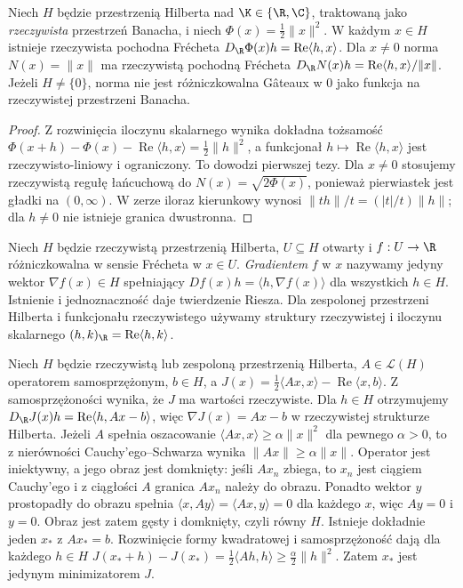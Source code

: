 \begin{twierdzenie}
\label{thm:hilbert-norm14}
Niech $H$ będzie przestrzenią Hilberta nad $\K\in\{\R,\C\}$, traktowaną jako \emph{rzeczywista} przestrzeń Banacha, i niech $\Phi(x)=\frac12\|x\|^2$. W każdym $x\in H$ istnieje rzeczywista pochodna Frécheta $D_{\R}\Phi(x)h=\operatorname{Re}\langle h,x\rangle$. Dla $x\ne0$ norma $N(x)=\|x\|$ ma rzeczywistą pochodną Frécheta
$D_{\R}N(x)h=\operatorname{Re}\langle h,x\rangle/\|x\|$.
Jeżeli $H\ne\{0\}$, norma nie jest różniczkowalna Gâteaux w $0$ jako funkcja na rzeczywistej przestrzeni Banacha.
\end{twierdzenie}
\begin{proof}
Z rozwinięcia iloczynu skalarnego wynika dokładna tożsamość
$\Phi(x+h)-\Phi(x)-\operatorname{Re}\langle h,x\rangle=\frac12\|h\|^2$, a funkcjonał $h\mapsto\operatorname{Re}\langle h,x\rangle$ jest rzeczywisto-liniowy i ograniczony. To dowodzi pierwszej tezy. Dla $x\ne0$ stosujemy rzeczywistą regułę łańcuchową do $N(x)=\sqrt{2\Phi(x)}$, ponieważ pierwiastek jest gładki na $(0,\infty)$. W zerze iloraz kierunkowy wynosi $\|th\|/t=(|t|/t)\|h\|$; dla $h\ne0$ nie istnieje granica dwustronna.
\end{proof}

\begin{definicja}
\label{def:gradient14}
Niech $H$ będzie rzeczywistą przestrzenią Hilberta, $U\subseteq H$ otwarty i $f:U\to\R$ różniczkowalna w sensie Frécheta w $x\in U$. \emph{Gradientem} $f$ w $x$ nazywamy jedyny wektor $\nabla f(x)\in H$ spełniający $Df(x)h=\langle h,\nabla f(x)\rangle$ dla wszystkich $h\in H$. Istnienie i jednoznaczność daje twierdzenie Riesza. Dla zespolonej przestrzeni Hilberta i funkcjonału rzeczywistego używamy struktury rzeczywistej i iloczynu skalarnego $(h,k)_{\R}=\operatorname{Re}\langle h,k\rangle$.
\end{definicja}

\begin{przyklad}
\label{ex:quadratic-energy14}
Niech $H$ będzie rzeczywistą lub zespoloną przestrzenią Hilberta, $A\in\mathcal L(H)$ operatorem samosprzężonym, $b\in H$, a $J(x)=\frac12\langle Ax,x\rangle-\operatorname{Re}\langle x,b\rangle$. Z samosprzężoności wynika, że $J$ ma wartości rzeczywiste. Dla $h\in H$ otrzymujemy
$D_{\R}J(x)h=\operatorname{Re}\langle h,Ax-b\rangle$, więc $\nabla J(x)=Ax-b$ w rzeczywistej strukturze Hilberta. Jeżeli $A$ spełnia oszacowanie $\langle Ax,x\rangle\ge\alpha\|x\|^2$ dla pewnego $\alpha>0$, to z nierówności Cauchy'ego--Schwarza wynika $\|Ax\|\ge\alpha\|x\|$. Operator jest iniektywny, a jego obraz jest domknięty: jeśli $Ax_n$ zbiega, to $x_n$ jest ciągiem Cauchy'ego i z ciągłości $A$ granica $Ax_n$ należy do obrazu. Ponadto wektor $y$ prostopadły do obrazu spełnia $\langle x,Ay\rangle=\langle Ax,y\rangle=0$ dla każdego $x$, więc $Ay=0$ i $y=0$. Obraz jest zatem gęsty i domknięty, czyli równy $H$. Istnieje dokładnie jeden $x_*$ z $Ax_*=b$. Rozwinięcie formy kwadratowej i samosprzężoność dają dla każdego $h\in H$
$J(x_*+h)-J(x_*)=\frac12\langle Ah,h\rangle\ge\frac\alpha2\|h\|^2$.
Zatem $x_*$ jest jedynym minimizatorem $J$.
\end{przyklad}

